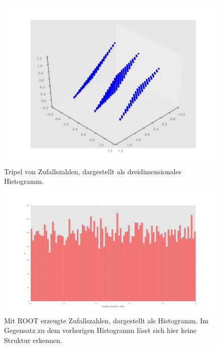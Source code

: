 \begin{itemize}
\begin{figure}
\centering
\includegraphics[width=\textwidth]{3dscatter.png}
\caption{Tripel von Zufallszahlen, dargestellt als dreidimensionales Histogramm.}
\label{fig:2c2}
\end{figure}
 

\begin{figure}
\centering
\includegraphics[width=\textwidth]{1dhist_root.png}
\caption{Mit ROOT erzeugte Zufallszahlen, dargestellt als Histogramm. Im Gegensatz zu dem vorherigen Histogramm lässt sich hier keine Struktur erkennen.}
\label{fig:2e1}
\end{figure}


\end{itemize}
